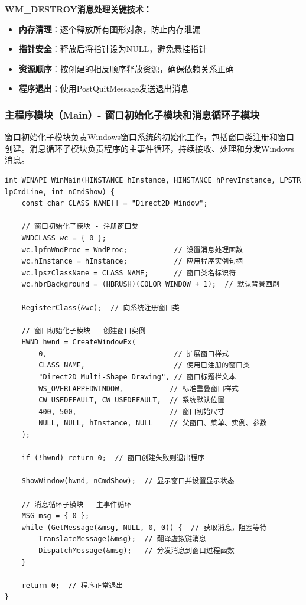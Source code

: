 \documentclass[12pt,a4paper]{article}
\begin{document}
\textbf{WM\_DESTROY消息处理关键技术：}
\begin{itemize}
    \item \textbf{内存清理}：逐个释放所有图形对象，防止内存泄漏
    \item \textbf{指针安全}：释放后将指针设为NULL，避免悬挂指针
    \item \textbf{资源顺序}：按创建的相反顺序释放资源，确保依赖关系正确
    \item \textbf{程序退出}：使用PostQuitMessage发送退出消息
\end{itemize}

\subsubsection{主程序模块（Main）- 窗口初始化子模块和消息循环子模块}

窗口初始化子模块负责Windows窗口系统的初始化工作，包括窗口类注册和窗口创建。消息循环子模块负责程序的主事件循环，持续接收、处理和分发Windows消息。

\begin{lstlisting}[caption=主程序入口函数实现]
int WINAPI WinMain(HINSTANCE hInstance, HINSTANCE hPrevInstance, LPSTR lpCmdLine, int nCmdShow) {
    const char CLASS_NAME[] = "Direct2D Window";

    // 窗口初始化子模块 - 注册窗口类
    WNDCLASS wc = { 0 };
    wc.lpfnWndProc = WndProc;           // 设置消息处理函数
    wc.hInstance = hInstance;           // 应用程序实例句柄
    wc.lpszClassName = CLASS_NAME;      // 窗口类名标识符
    wc.hbrBackground = (HBRUSH)(COLOR_WINDOW + 1);  // 默认背景画刷

    RegisterClass(&wc);  // 向系统注册窗口类

    // 窗口初始化子模块 - 创建窗口实例
    HWND hwnd = CreateWindowEx(
        0,                              // 扩展窗口样式
        CLASS_NAME,                     // 使用已注册的窗口类
        "Direct2D Multi-Shape Drawing", // 窗口标题栏文本
        WS_OVERLAPPEDWINDOW,           // 标准重叠窗口样式
        CW_USEDEFAULT, CW_USEDEFAULT,  // 系统默认位置
        400, 500,                      // 窗口初始尺寸
        NULL, NULL, hInstance, NULL    // 父窗口、菜单、实例、参数
    );

    if (!hwnd) return 0;  // 窗口创建失败则退出程序

    ShowWindow(hwnd, nCmdShow);  // 显示窗口并设置显示状态

    // 消息循环子模块 - 主事件循环
    MSG msg = { 0 };
    while (GetMessage(&msg, NULL, 0, 0)) {  // 获取消息，阻塞等待
        TranslateMessage(&msg);  // 翻译虚拟键消息
        DispatchMessage(&msg);   // 分发消息到窗口过程函数
    }

    return 0;  // 程序正常退出
}
\end{lstlisting}
\end{document}
